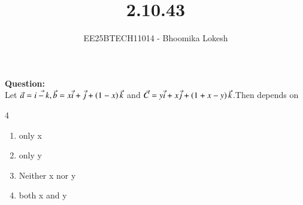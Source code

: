 \documentclass[journal]{IEEEtran}
\begin{document}

\vspace{3cm}

\title{2.10.43}
\author{EE25BTECH11014 - Bhoomika Lokesh}
{\let\newpage\relax\maketitle}

\renewcommand{\thefigure}{\theenumi}
\renewcommand{\thetable}{\theenumi}
\setlength{\intextsep}{10pt} %

\renewcommand{\thetable}{\theenumi}


\textbf{Question:}\\
 Let $\Vec{a}=\Vec{i-k},\Vec{b}=x\Vec{i}+\Vec{j}+\left(1-x\right)\Vec{k}$ and $\Vec{C}=y\Vec{i}+x\Vec{j}+\left(1+x-y\right)\Vec{k}$.Then  depends on 
\begin{multicols}{4}
\begin{enumerate}
\item only x
\item only y
\item Neither x nor y
\item both x and y
\end{enumerate}
\end{multicols}
\end{document}
